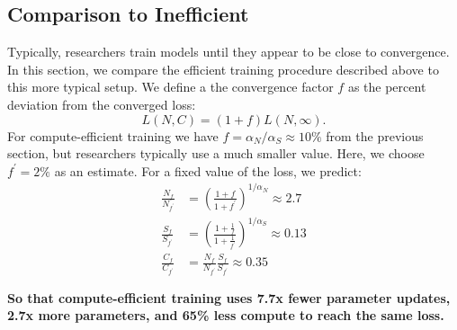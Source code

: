 \documentclass[english]{article}
\begin{document}
\subsection{Comparison to Inefficient}
Typically, researchers train models until they appear to be close to convergence. In this section, we compare the efficient training procedure described above to this more typical setup.
We define a the convergence factor $f$ as the percent deviation from the converged loss:
\begin{equation}
L\left(N,C\right)=\left(1+f\right)L\left(N,\infty\right).
\end{equation}
For compute-efficient training we have $f=\alpha_{N}/\alpha_{S}\approx10\%$ from the previous section, but researchers typically use a much smaller value. Here, we choose $f^{\prime}=2\%$ as an estimate.
For a fixed value of the loss, we predict:
\begin{align}
\frac{N_{f}}{N_{f^{\prime}}} & =\left(\frac{1+f}{1+f^{\prime}}\right)^{1/\alpha_{N}}\approx2.7\\
\frac{S_{f}}{S_{f^{\prime}}} & =\left(\frac{1+\frac{1}{f}}{1+\frac{1}{f^{\prime}}}\right)^{1/\alpha_{S}}\approx0.13\\
\frac{C_{f}}{C_{f^{\prime}}} & =\frac{N_{f}}{N_{f^{\prime}}}\frac{S_{f}}{S_{f^{\prime}}}\approx0.35
\end{align}

\textbf{So that compute-efficient training uses 7.7x fewer parameter updates, 2.7x more parameters, and 65\% less compute to reach the same loss.}
\end{document}
